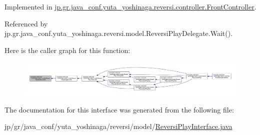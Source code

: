 Implemented in \hyperlink{classjp_1_1gr_1_1java__conf_1_1yuta__yoshinaga_1_1reversi_1_1controller_1_1_front_controller_af513d1ccfca9fc00f93fb650f1f08b05}{jp.\+gr.\+java\+\_\+conf.\+yuta\+\_\+yoshinaga.\+reversi.\+controller.\+Front\+Controller}.



Referenced by jp.\+gr.\+java\+\_\+conf.\+yuta\+\_\+yoshinaga.\+reversi.\+model.\+Reversi\+Play\+Delegate.\+Wait().

Here is the caller graph for this function\+:
\nopagebreak
\begin{figure}[H]
\begin{center}
\leavevmode
\includegraphics[width=350pt]{interfacejp_1_1gr_1_1java__conf_1_1yuta__yoshinaga_1_1reversi_1_1model_1_1_reversi_play_interface_abd7fc4193840e8c7bdf95bc538e1b649_icgraph}
\end{center}
\end{figure}


The documentation for this interface was generated from the following file\+:\begin{DoxyCompactItemize}
\item 
jp/gr/java\+\_\+conf/yuta\+\_\+yoshinaga/reversi/model/\hyperlink{_reversi_play_interface_8java}{Reversi\+Play\+Interface.\+java}\end{DoxyCompactItemize}

